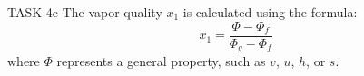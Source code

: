 TASK 4c  
The vapor quality \( x_1 \) is calculated using the formula:  
\[
x_1 = \frac{\Phi - \Phi_f}{\Phi_g - \Phi_f}
\]  
where \( \Phi \) represents a general property, such as \( v \), \( u \), \( h \), or \( s \).